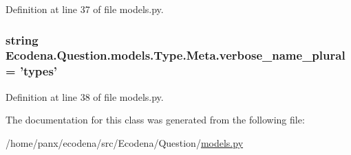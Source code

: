 Definition at line 37 of file models.py.

\hypertarget{class_ecodena_1_1_question_1_1models_1_1_type_1_1_meta_ae1c74aca97a425904b8ee3026812fefe}{
\subsubsection[{verbose\_\-name\_\-plural}]{\setlength{\rightskip}{0pt plus 5cm}string {\bf Ecodena.Question.models.Type.Meta.verbose\_\-name\_\-plural} = 'types'}}
\label{db/d77/class_ecodena_1_1_question_1_1models_1_1_type_1_1_meta_ae1c74aca97a425904b8ee3026812fefe}


Definition at line 38 of file models.py.



The documentation for this class was generated from the following file:\begin{DoxyCompactItemize}
\item 
/home/panx/ecodena/src/Ecodena/Question/\hyperlink{_question_2models_8py}{models.py}\end{DoxyCompactItemize}
